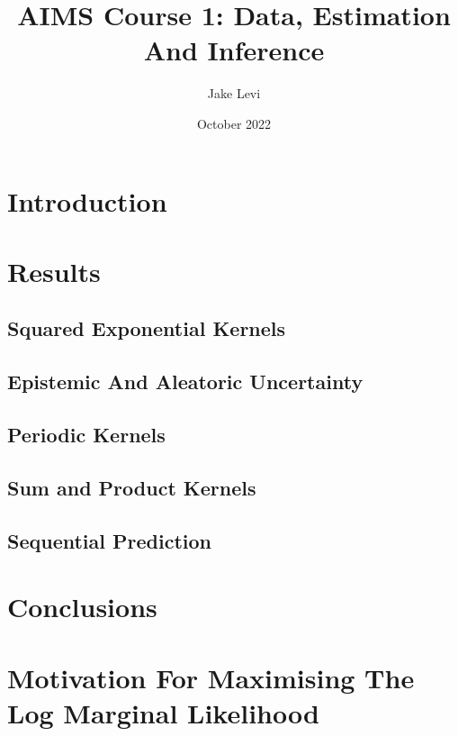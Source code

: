 \documentclass{article}
\title{AIMS Course 1: Data, Estimation And Inference}
\author{Jake Levi}
\date{October 2022}
\begin{document}
\maketitle
\section{Introduction} \label{section:intro}


\section{Results}
\subsection{Squared Exponential Kernels} \label{section:sqe}

\subsection{Epistemic And Aleatoric Uncertainty} \label{section:uncertainty}


\subsection{Periodic Kernels}


\subsection{Sum and Product Kernels}

\subsection{Sequential Prediction}


\section{Conclusions}



\appendix
\section{Motivation For Maximising The Log Marginal Likelihood}\label{appendix:why_lml}





\end{document}
